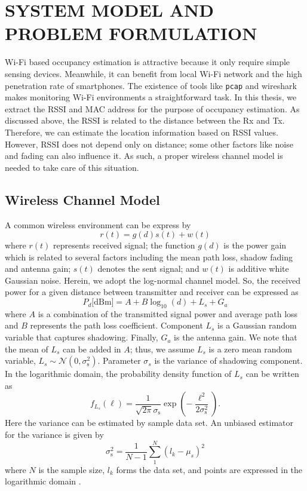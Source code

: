 \chapter{SYSTEM MODEL AND PROBLEM FORMULATION}

Wi-Fi based occupancy estimation is attractive because it only require simple sensing devices.
Meanwhile, it can benefit from local Wi-Fi network and the high penetration rate of smartphones.
The existence of tools like \texttt{pcap} and wireshark makes monitoring Wi-Fi environments a straightforward task.
In this thesis, we extract the RSSI and MAC address for the purpose of occupancy estimation.
As discussed above, the RSSI is related to the distance between the Rx and Tx.
Therefore, we can estimate the location information based on RSSI values.
However, RSSI does not depend only on distance; some other factors like noise and fading can also influence it.
As such, a proper wireless channel model is needed to take care of this situation.


\section{Wireless Channel Model}
\label{section:channel}

A common wireless environment can be express by
\begin{equation*}
r (t) = g (d) s (t) + w (t)
\end{equation*}
where $r (t)$ represents received signal; the function $g (d)$ is the power gain which is related to several factors including the mean path loss, shadow fading and antenna gain; $s (t)$ denotes the sent signal; and $w (t)$ is additive white Gaussian noise.
Herein, we adopt the log-normal channel model.
So, the received power for a given distance between transmitter and receiver can be expressed as
\begin{equation} \label{channel}
P_{d} \text{[dBm]}
= A + B \log_{10}(d) + L_{s} + G_{a} 
\end{equation}
where $A$ is a combination of the transmitted signal power and average path loss
and $B$ represents the path loss coefficient.
Component $L_{s}$ is a Gaussian random variable that captures shadowing.
Finally, $G_{a}$ is the antenna gain.
We note that the mean of $L_{s}$ can be added in $A$; thus, we assume $L_{s}$ is a zero mean random variable, $L_{s} \sim \mathcal{N}(0,\sigma_{\mathrm{s}}^2)$.
Parameter $\sigma_{s}$ is the variance of shadowing component.
In the logarithmic domain, the probability density function of $L_{s}$ can be written as
\begin{equation*}
f_{L_{s}} (\ell)
= \frac{1}{\sqrt{2 \pi} \sigma_{\mathrm{s}}} 
\exp \left( - \frac{\ell^2}{2 \sigma_{\mathrm{s}}^2} \right) .
\end{equation*}
Here the variance can be estimated by sample data set.
An unbiased estimator for the variance is given by~\cite{zwillinger1995crc}
\begin{equation*}
\sigma_{\mathrm{s}}^2 = \frac{1}{N-1} \sum_{1}^{N} (l_{k}-\mu_{s})^2
\end{equation*} 
where $N$ is the sample size, $l_{k}$ forms the data set, and points are expressed in the logarithmic domain \cite{kay1993fundamentals,poor1998introduction}.

